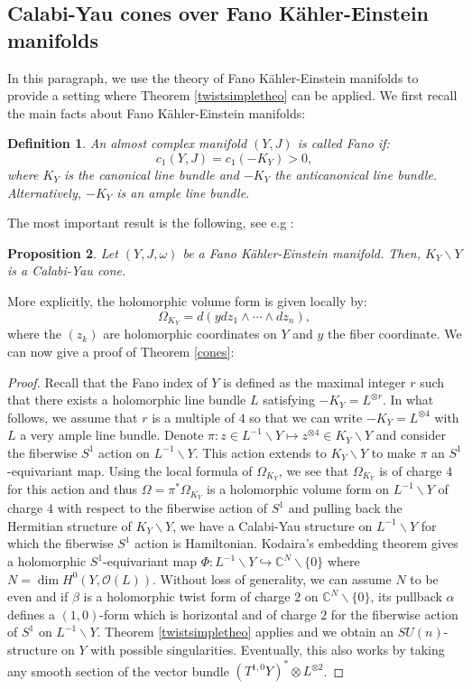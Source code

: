 \documentclass[12pt, reqno]{amsart}
\newtheorem{Def}{Definition}[subsection]
\newtheorem{prop}[Def]{Proposition}
\newcommand{\C}{\mathbb{C}}
\newcommand{\Or}{\mathcal{O}}
\begin{document}
\subsection{Calabi-Yau cones over Fano Kähler-Einstein manifolds} In this paragraph, we use the theory of Fano Kähler-Einstein manifolds to provide a setting where Theorem \ref{twistsimpletheo} can be applied. We first recall the main facts about Fano Kähler-Einstein manifolds:
\begin{Def}
    An almost complex manifold $(Y,J)$ is called Fano if: \[c_1(Y,J)=c_1(-K_Y)>0,\] where $K_Y$ is the canonical line bundle and $-K_Y$ the anticanonical line bundle. Alternatively, $-K_Y$ is an ample line bundle.
\end{Def}
The most important result is the following, see e.g \cite{sparks2010sasakieinsteinmanifolds}:
\begin{prop}
   Let $(Y,J,\omega)$ be a Fano Kähler-Einstein manifold. Then, $K_Y\backslash Y$ is a Calabi-Yau cone. 
\end{prop}
More explicitly, the holomorphic volume form is given locally by: \[\Omega_{K_Y}=d(ydz_1\wedge\cdots\wedge dz_n),\] where the $(z_k)$ are holomorphic coordinates on $Y$ and $y$ the fiber coordinate. We can now give a proof of Theorem \ref{cones}:
\begin{proof}
    Recall that the Fano index of $Y$ is defined as the maximal integer $r$ such that there exists a holomorphic line bundle $L$ satisfying $-K_Y=L^{\otimes r}$. In what follows, we assume that $r$ is a multiple of $4$ so that we can write $-K_Y=L^{\otimes 4}$ with $L$ a very ample line bundle. Denote $\pi : z\in L^{-1}\backslash Y\mapsto z^{\otimes 4}\in K_Y\backslash Y$ and consider the fiberwise $S^1$ action on $L^{-1}\backslash Y$. This action extends to $K_Y\backslash Y$ to make $\pi$ an $S^1$-equivariant map. Using the local formula of $\Omega_{K_Y}$, we see that $\Omega_{K_Y}$ is of charge $4$ for this action and thus $\Omega=\pi^*\Omega_{K_Y}$ is a holomorphic volume form on $L^{-1}\backslash Y$ of charge $4$ with respect to the fiberwise action of $S^1$ and pulling back the Hermitian structure of $K_Y\backslash Y$, we have a Calabi-Yau structure on $L^{-1}\backslash Y$ for which the fiberwise $S^1$ action is Hamiltonian. Kodaira's embedding theorem gives a holomorphic $S^1$-equivariant map $\Phi : L^{-1}\backslash Y\hookrightarrow\C^N\backslash\{0\}$ where $N=\dim H^0(Y,\Or(L))$. Without loss of generality, we can assume $N$ to be even and if $\beta$ is a holomorphic twist form of charge $2$ on $\C^N\backslash\{0\}$, its pullback $\alpha$ defines a $(1,0)$-form which is horizontal and of charge $2$ for the fiberwise action of $S^1$ on $L^{-1}\backslash Y$. Theorem \ref{twistsimpletheo} applies and we obtain an $SU(n)$-structure on $Y$ with possible singularities. Eventually, this also works by taking any smooth section of the vector bundle $(T^{1,0}Y)^*\otimes L^{\otimes 2} $.
\end{proof}
\end{document}

